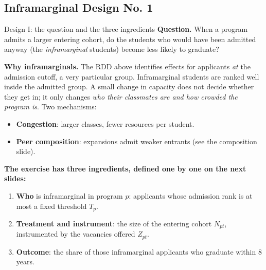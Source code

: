 \documentclass{beamer}
\begin{document}
\subsection{Inframarginal Design No. 1}
\begin{frame}{Design I: the question and the three ingredients}
\footnotesize
\textbf{Question.} When a program admits a larger entering cohort, do the students who would have been admitted
anyway (the \emph{inframarginal} students) become less likely to graduate?

\vspace{0.12cm}
\textbf{Why inframarginals.} The RDD above identifies effects for applicants \emph{at} the admission cutoff, a very particular group.
Inframarginal students are ranked well inside the admitted group. A small change in capacity does not decide whether they get in;
it only changes \emph{who their classmates are and how crowded the program is}.
Two mechanisms:
\begin{itemize}
    \item \textbf{Congestion}: larger classes, fewer resources per student.
    \item \textbf{Peer composition}: expansions admit weaker entrants (see the composition slide).
\end{itemize}

\vspace{0.12cm}
\textbf{The exercise has three ingredients, defined one by one on the next slides:}
\begin{enumerate}
    \item \textbf{Who} is inframarginal in program $p$: applicants whose admission rank is at most a fixed threshold $T_p$.
    \item \textbf{Treatment and instrument}: the size of the entering cohort $N_{pt}$, instrumented by the vacancies offered $Z_{pt}$.
    \item \textbf{Outcome}: the share of those inframarginal applicants who graduate within 8 years.
\end{enumerate}
\end{frame}
\end{document}
